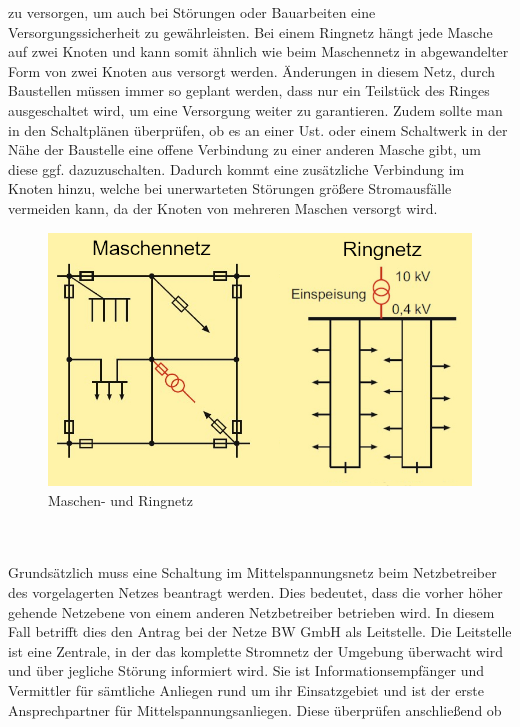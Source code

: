 zu versorgen, um auch bei Störungen oder Bauarbeiten eine Versorgungssicherheit zu gewährleisten. Bei einem Ringnetz hängt jede Masche auf zwei Knoten und 
kann somit ähnlich wie beim Maschennetz  in abgewandelter Form von zwei Knoten aus versorgt werden. Änderungen in diesem Netz, \zB durch Baustellen müssen 
immer so geplant werden, dass nur ein Teilstück des Ringes ausgeschaltet wird, um eine Versorgung weiter zu garantieren. Zudem sollte man in den Schaltplänen 
überprüfen, ob es an einer Ust. oder einem Schaltwerk in der Nähe der Baustelle eine offene Verbindung zu einer anderen Masche gibt, um diese ggf. 
dazuzuschalten. Dadurch kommt eine zusätzliche Verbindung im Knoten hinzu, welche bei unerwarteten Störungen größere Stromausfälle vermeiden kann, da der 
Knoten von mehreren Maschen versorgt wird. \autocite{Schwab.2012}
\begin{figure}[hbt]
    \centering
    \includegraphics[width=0.98\linewidth]{images/Ring und Maschennetz}
    \caption[Maschen/Ringnetz]{Maschen- und Ringnetz \autocite{Schwab.2012}}
    \label{fig:Maschen/Ringnetz}
\end{figure}
\\\\
Grundsätzlich muss eine Schaltung im Mittelspannungsnetz beim Netzbetreiber des vorgelagerten Netzes  beantragt werden. Dies bedeutet, dass die vorher höher 
gehende Netzebene von einem anderen Netzbetreiber betrieben wird. In diesem Fall betrifft dies den Antrag bei der Netze BW GmbH als Leitstelle. Die Leitstelle 
ist eine Zentrale, in der das komplette Stromnetz der Umgebung überwacht wird und über jegliche Störung informiert wird. Sie ist Informationsempfänger und 
Vermittler für sämtliche Anliegen rund um ihr Einsatzgebiet und ist der erste Ansprechpartner für Mittelspannungsanliegen. Diese überprüfen anschließend ob 
